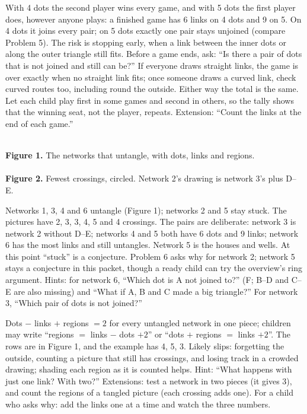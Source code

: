 With 4 dots the second player wins every game, and with 5 dots the first player does, however anyone plays: a finished game has 6 links on 4 dots and 9 on 5. On 4 dots it joins every pair; on 5 dots exactly one pair stays unjoined (compare Problem 5). The risk is stopping early, when a link between the inner dots or along the outer triangle still fits. Before a game ends, ask: ``Is there a pair of dots that is not joined and still can be?'' If everyone draws straight links, the game is over exactly when no straight link fits; once someone draws a curved link, check curved routes too, including round the outside. Either way the total is the same. Let each child play first in some games and second in others, so the tally shows that the winning seat, not the player, repeats. Extension: ``Count the links at the end of each game.''

\begin{center}
\hfill{}\hfill{}\hfill{}\\[4pt]
{\small\textbf{Figure 1.} The networks that untangle, with dots, links and regions.}\\[10pt]
\qquad{}\qquad{}\\[4pt]
{\small\textbf{Figure 2.} Fewest crossings, circled. Network 2's drawing is network 3's plus D--E.}
\end{center}

Networks 1, 3, 4 and 6 untangle (Figure 1); networks 2 and 5 stay stuck. The pictures have 2, 3, 3, 4, 5 and 4 crossings. The pairs are deliberate: network 3 is network 2 without D--E; networks 4 and 5 both have 6 dots and 9 links; network 6 has the most links and still untangles. Network 5 is the houses and wells. At this point ``stuck'' is a conjecture. Problem 6 asks why for network 2; network 5 stays a conjecture in this packet, though a ready child can try the overview's ring argument. Hints: for network 6, ``Which dot is A not joined to?'' (F; B--D and C--E are also missing) and ``What if A, B and C made a big triangle?'' For network 3, ``Which pair of dots is not joined?''

Dots $-$ links $+$ regions $=2$ for every untangled network in one piece; children may write ``regions $=$ links $-$ dots $+2$'' or ``dots $+$ regions $=$ links $+2$''. The rows are in Figure 1, and the example has 4, 5, 3. Likely slips: forgetting the outside, counting a picture that still has crossings, and losing track in a crowded drawing; shading each region as it is counted helps. Hint: ``What happens with just one link? With two?'' Extensions: test a network in two pieces (it gives 3), and count the regions of a tangled picture (each crossing adds one). For a child who asks why: add the links one at a time and watch the three numbers.


